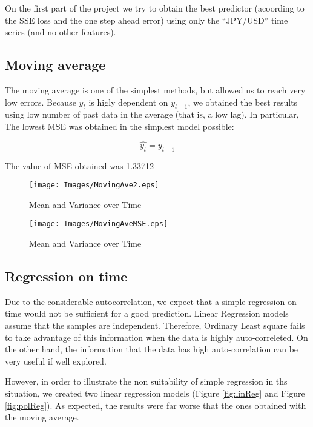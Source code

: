 On the first part of the project we try to obtain the best predictor (acoording to the SSE loss and the one step 
ahead error) using only the ``JPY/USD'' time series (and no other features).

\subsection{Moving average}

The moving average is one of the simplest methods, but allowed us to reach very low errors.
Because $y_t$ is higly dependent on $y_{t-1}$, we obtained the best results using
low number of past data in the average (that is, a low lag). In particular, The lowest MSE was
obtained in the simplest model possible: 

$$\hat{y_t} = y_{t-1}$$

The value of MSE obtained was
1.33712

\begin{figure}[!ht]
        \centering
        \texttt{[image: Images/MovingAve2.eps]}
        \caption{Mean and Variance over Time}
        \label{fig:MovAve}
\end{figure}

\begin{figure}[!ht]
        \centering
        \texttt{[image: Images/MovingAveMSE.eps]}
        \caption{Mean and Variance over Time}
        \label{fig:MovAveMSE}
\end{figure}



\subsection{Regression on time}

Due to the considerable autocorrelation, we expect that a simple regression on time would not be sufficient for
a good prediction. Linear Regression models assume that the samples are independent. 
Therefore, Ordinary Least square fails to take advantage of this information when the data is highly 
auto-correleted. 
On the other hand, the information that the data has high auto-correlation can be very useful if well explored.

However, in order to illustrate the non suitability of simple regression in ths situation,
we created two linear regression models (Figure \ref{fig:linReg} and Figure \ref{fig:polReg}). As expected, the results  were far worse that the ones obtained with the moving average.

